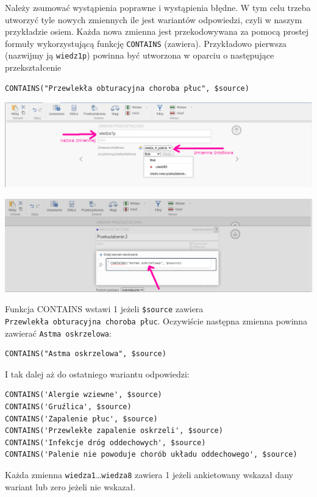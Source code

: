 \documentclass[
  openany]{book}
\begin{document}
Należy zsumować wystąpienia poprawne i wystąpienia błędne. W tym celu trzeba utworzyć tyle
nowych zmiennych ile jest wariantów odpowiedzi, czyli w naszym przykładzie osiem. Każda
nowa zmienna jest przekodowywana za pomocą prostej formuły wykorzystującą funkcję \texttt{CONTAINS} (zawiera).
Przykładowo pierwsza (nazwijmy ją \texttt{wiedz1p}) powinna być utworzona w oparciu o następujące przekształcenie

\begin{verbatim}
CONTAINS("Przewlekła obturacyjna choroba płuc", $source)
\end{verbatim}

\includegraphics{./przeksztalcenie_4.png}

\includegraphics{./przeksztalcenie_contains.png}

Funkcja CONTAINS wstawi 1 jeżeli \texttt{\$source} zawiera \texttt{Przewlekła\ obturacyjna\ choroba\ płuc}.
Oczywiście następna zmienna powinna zawierać \texttt{Astma\ oskrzelowa}:

\begin{verbatim}
CONTAINS("Astma oskrzelowa", $source)
\end{verbatim}

I tak dalej aż do ostatniego wariantu odpowiedzi:

\begin{verbatim}
CONTAINS('Alergie wziewne', $source)
CONTAINS('Gruźlica', $source)
CONTAINS('Zapalenie płuc', $source)
CONTAINS('Przewlekłe zapalenie oskrzeli', $source)
CONTAINS('Infekcje dróg oddechowych', $source)
CONTAINS('Palenie nie powoduje chorób układu oddechowego', $source)
\end{verbatim}

Każda zmienna \texttt{wiedza1}\ldots{}\texttt{wiedza8} zawiera 1 jeżeli ankietowany wskazał dany wariant lub zero jeżeli
nie wskazał.
\end{document}
